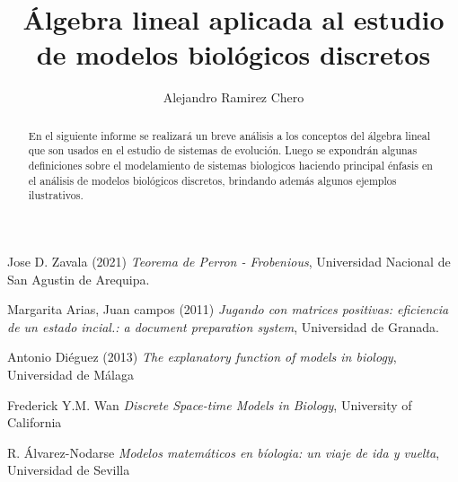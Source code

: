 


\title{Álgebra lineal aplicada al estudio de modelos biológicos discretos}

\author{Alejandro Ramirez Chero}







\maketitle

\begin{abstract}
	En el siguiente informe se realizará un breve análisis a los conceptos del álgebra lineal que  son usados en el estudio de sistemas de evolución. Luego se expondrán algunas definiciones sobre el modelamiento de sistemas biologicos haciendo principal énfasis en el análisis de modelos biológicos discretos, brindando además algunos ejemplos ilustrativos.
\end{abstract}

\pagebreak

\tableofcontents











\begin{thebibliography}{6}
Jose D. Zavala (2021) \emph{Teorema de Perron - Frobenious}, Universidad Nacional de San Agustin de Arequipa.

Margarita Arias, Juan campos (2011) \emph{Jugando con matrices positivas: eficiencia de un estado incial.: a document preparation system}, Universidad de Granada.

Antonio Diéguez (2013) \emph{The explanatory function of models in biology}, Universidad de Málaga

Frederick Y.M. Wan \emph{Discrete Space-time Models in Biology}, University of California

R. Álvarez-Nodarse \emph{Modelos matemáticos en bíologia:  un viaje de ida y vuelta}, Universidad de Sevilla
\end{thebibliography}




